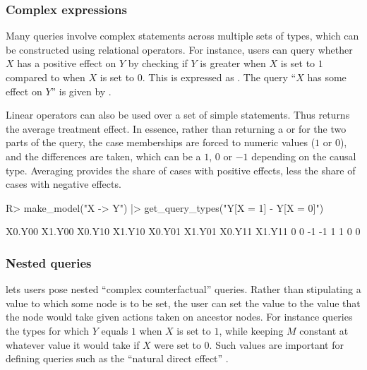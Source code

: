 \documentclass[
  11pt,
  article]{jss}
\renewcommand{\texttt}[1]{\code{#1}}
\begin{document}
\subsubsection{Complex expressions}\label{complex-expressions}

Many queries involve complex statements across multiple sets of types,
which can be constructed using relational operators. For instance, users
can query whether \(X\) has a positive effect on \(Y\) by checking if
\(Y\) is greater when \(X\) is set to \(1\) compared to when \(X\) is
set to \(0\). This is expressed as
\texttt{"Y{[}X\ =\ 1{]}\ \textgreater{}\ Y{[}X\ =\ 0{]}"}. The query
``\(X\) has some effect on \(Y\)'' is given by
\texttt{"Y{[}X\ =\ 1{]}\ !=\ Y{[}X\ =\ 0{]}"}.

Linear operators can also be used over a set of simple statements. Thus
\texttt{"Y{[}X\ =\ 1{]}\ -\ Y{[}X\ =\ 0{]}"} returns the average
treatment effect. In essence, rather than returning a \texttt{TRUE} or
\texttt{FALSE} for the two parts of the query, the case memberships are
forced to numeric values (\(1\) or \(0\)), and the differences are
taken, which can be a \(1\), \(0\) or \(-1\) depending on the causal
type. Averaging provides the share of cases with positive effects, less
the share of cases with negative effects.

\begin{CodeChunk}
\begin{CodeInput}
R> make_model("X -> Y") |> get_query_types("Y[X = 1] - Y[X = 0]")
\end{CodeInput}

\begin{CodeOutput}
X0.Y00 X1.Y00 X0.Y10 X1.Y10 X0.Y01 X1.Y01 X0.Y11 X1.Y11
     0      0     -1     -1      1      1      0      0
\end{CodeOutput}
\end{CodeChunk}

\subsubsection{Nested queries}\label{nested-queries}

 lets users pose nested ``complex counterfactual''
queries. Rather than stipulating a value to which some node is to be
set, the user can set the value to the value that the node would take
given actions taken on ancestor nodes. For instance
\texttt{"Y{[}M\ =\ M{[}X\ =\ 0{]},\ X\ =\ 1{]}\ ==\ 1"} queries the
types for which \(Y\) equals \(1\) when \(X\) is set to \(1\), while
keeping \(M\) constant at whatever value it would take if \(X\) were set
to \(0\). Such values are important for defining queries such as the
``natural direct effect'' \citep{pearl2022direct}.
\end{document}
